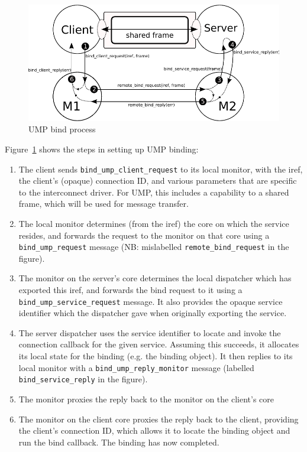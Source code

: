 \documentclass[a4paper,twoside]{report} %
\begin{document}
\begin{figure}
  \includegraphics[width=\columnwidth]{figures/ump_bind}
  \caption{UMP bind process}\label{fig:ump_bind}
\end{figure}

Figure~\ref{fig:ump_bind} shows the steps in setting up UMP binding:
\begin{enumerate}
 \item The client sends \lstinline+bind_ump_client_request+ to its local monitor,
      with the iref, the client's (opaque) connection ID, and various parameters
      that are specific to the interconnect driver. For UMP, this includes a
      capability to a shared frame, which will be used for message transfer.
 \item The local monitor determines (from the iref) the core on which the
      service resides, and forwards the request to the monitor on that core
      using a \lstinline+bind_ump_request+ message (NB: mislabelled
      \lstinline+remote_bind_request+ in the figure).
 \item The monitor on the server's core determines the local dispatcher which
      has exported this iref, and forwards the bind request to it using a
      \lstinline+bind_ump_service_request+ message. It also provides the
      opaque service identifier which the dispatcher gave when originally
      exporting the service.
 \item The server dispatcher uses the service identifier to locate and invoke
      the connection callback for the given service. Assuming this succeeds, it
      allocates its local state for the binding (e.g. the binding object). It
      then replies to its local monitor with a
      \lstinline+bind_ump_reply_monitor+ message (labelled
      \lstinline+bind_service_reply+ in the figure).
 \item The monitor proxies the reply back to the monitor on the client's core
 \item The monitor on the client core proxies the reply back to the client,
      providing the client's connection ID, which allows it to locate the
      binding object and run the bind callback. The binding has now completed.
\end{enumerate}
\end{document}
